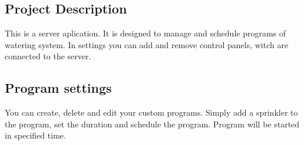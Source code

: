 \subsection*{Project Description }

This is a server aplication. It is designed to manage and schedule programs of watering system. In settings you can add and remove control panels, witch are connected to the server.

\subsection*{Program settings }

You can create, delete and edit your custom programs. Simply add a sprinkler to the program, set the duration and schedule the program. Program will be started in specified time. 